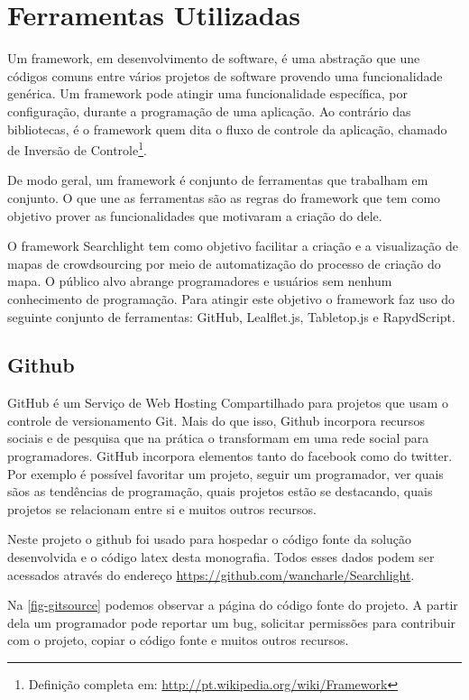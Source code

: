 \section{Ferramentas Utilizadas}

Um framework, em desenvolvimento de software, é uma abstração que une códigos comuns entre vários projetos de software provendo uma funcionalidade genérica. Um framework pode atingir uma funcionalidade específica, por configuração, durante a programação de uma aplicação. Ao contrário das bibliotecas, é o framework quem dita o fluxo de controle da aplicação, chamado de Inversão de Controle\footnote{Definição completa em: \url{http://pt.wikipedia.org/wiki/Framework}}.

De modo geral, um framework é conjunto de ferramentas que trabalham em conjunto. O que une as ferramentas são as regras do framework que tem como objetivo prover as funcionalidades que motivaram a criação do dele.

O framework Searchlight tem como objetivo facilitar a criação e a visualização de mapas de crowdsourcing por meio de automatização do processo de criação do mapa. O público alvo abrange  programadores e usuários sem nenhum conhecimento de programação. Para atingir este objetivo o framework faz uso do seguinte conjunto de ferramentas: GitHub, Lealflet.js,  Tabletop.js e RapydScript. 



\subsection{Github\label{github}}
GitHub é um Serviço de Web Hosting Compartilhado para projetos que usam o controle de versionamento Git. Mais do que isso, Github incorpora recursos sociais e de pesquisa que na prática o transformam em uma rede social para programadores. GitHub incorpora elementos tanto do facebook como do twitter. Por exemplo é possível favoritar um projeto, seguir um programador, ver quais sãos as tendências de programação, quais projetos estão se destacando, quais projetos se relacionam entre si e muitos outros recursos.

Neste projeto o github foi usado para hospedar o código fonte da solução desenvolvida e o código latex desta monografia. Todos esses dados podem ser acessados através do endereço \url{https://github.com/wancharle/Searchlight}. 

Na \autoref{fig-gitsource} podemos observar a página do código fonte do projeto. A partir dela um programador pode reportar um bug, solicitar permissões para contribuir com o projeto, copiar o código fonte e muitos outros recursos. 

